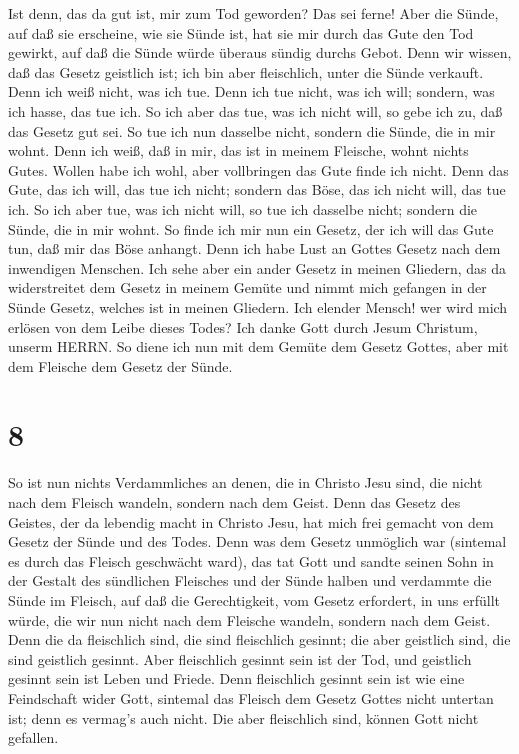  Ist denn, das da gut ist, mir zum Tod geworden? Das sei
ferne! Aber die Sünde, auf daß sie erscheine, wie sie Sünde ist, hat sie
mir durch das Gute den Tod gewirkt, auf daß die Sünde würde überaus
sündig durchs Gebot.  Denn wir wissen, daß das Gesetz
geistlich ist; ich bin aber fleischlich, unter die Sünde verkauft.
 Denn ich weiß nicht, was ich tue. Denn ich tue nicht, was
ich will; sondern, was ich hasse, das tue ich.  So ich aber
das tue, was ich nicht will, so gebe ich zu, daß das Gesetz gut sei.
 So tue ich nun dasselbe nicht, sondern die Sünde, die in
mir wohnt.  Denn ich weiß, daß in mir, das ist in meinem
Fleische, wohnt nichts Gutes. Wollen habe ich wohl, aber vollbringen das
Gute finde ich nicht.  Denn das Gute, das ich will, das tue
ich nicht; sondern das Böse, das ich nicht will, das tue ich.
 So ich aber tue, was ich nicht will, so tue ich dasselbe
nicht; sondern die Sünde, die in mir wohnt.  So finde ich
mir nun ein Gesetz, der ich will das Gute tun, daß mir das Böse anhangt.
 Denn ich habe Lust an Gottes Gesetz nach dem inwendigen
Menschen.  Ich sehe aber ein ander Gesetz in meinen
Gliedern, das da widerstreitet dem Gesetz in meinem Gemüte und nimmt
mich gefangen in der Sünde Gesetz, welches ist in meinen Gliedern.
 Ich elender Mensch! wer wird mich erlösen von dem Leibe
dieses Todes?  Ich danke Gott durch Jesum Christum, unserm
HERRN. So diene ich nun mit dem Gemüte dem Gesetz Gottes, aber mit dem
Fleische dem Gesetz der Sünde.

\hypertarget{section-7}{%
\section{8}\label{section-7}}

 So ist nun nichts Verdammliches an denen, die in Christo
Jesu sind, die nicht nach dem Fleisch wandeln, sondern nach dem Geist.
 Denn das Gesetz des Geistes, der da lebendig macht in
Christo Jesu, hat mich frei gemacht von dem Gesetz der Sünde und des
Todes.  Denn was dem Gesetz unmöglich war (sintemal es durch
das Fleisch geschwächt ward), das tat Gott und sandte seinen Sohn in der
Gestalt des sündlichen Fleisches und der Sünde halben und verdammte die
Sünde im Fleisch,  auf daß die Gerechtigkeit, vom Gesetz
erfordert, in uns erfüllt würde, die wir nun nicht nach dem Fleische
wandeln, sondern nach dem Geist.  Denn die da fleischlich
sind, die sind fleischlich gesinnt; die aber geistlich sind, die sind
geistlich gesinnt.  Aber fleischlich gesinnt sein ist der
Tod, und geistlich gesinnt sein ist Leben und Friede.  Denn
fleischlich gesinnt sein ist wie eine Feindschaft wider Gott, sintemal
das Fleisch dem Gesetz Gottes nicht untertan ist; denn es vermag's auch
nicht.  Die aber fleischlich sind, können Gott nicht
gefallen.

